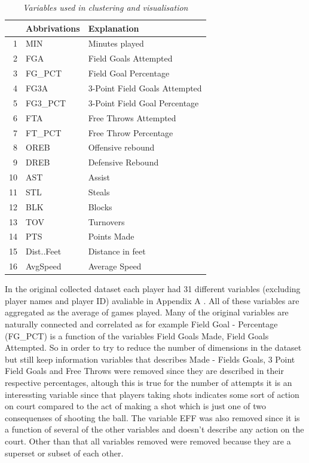 \documentclass{article}
\begin{document}
\begin{table}[ht]
\centering
\begin{tabular}{rll}
  \hline
 & \textbf{Abbrivations} & \textbf{Explanation} \\ 
  \hline
1 & MIN & Minutes played \\ 
  2 & FGA & Field Goals Attempted \\ 
  3 & FG\_PCT & Field Goal Percentage \\ 
  4 & FG3A & 3-Point Field Goals Attempted \\ 
  5 & FG3\_PCT & 3-Point Field Goal Percentage \\ 
  6 & FTA & Free Throws Attempted \\ 
  7 & FT\_PCT & Free Throw Percentage \\ 
  8 & OREB & Offensive rebound \\ 
  9 & DREB & Defensive Rebound \\ 
  10 & AST & Assist \\ 
  11 & STL & Steals \\ 
  12 & BLK & Blocks \\ 
  13 & TOV & Turnovers \\ 
  14 & PTS & Points Made \\ 
  15 & Dist..Feet & Distance in feet \\ 
  16 & AvgSpeed & Average Speed \\
   \hline
\end{tabular}
\caption{\textit{Variables used in clustering and visualisation}} 
\end{table}

In the original collected dataset each player had 31 different variables (excluding player names and player ID) avaliable in Appendix A . All of these variables are aggregated as the average of games played.   Many of the original variables are naturally connected and correlated as for example Field Goal - Percentage (FG\_PCT) is a function of the variables Field Goals Made, Field Goals Attempted. So in order to try to reduce the number of dimensions in the dataset but still keep information variables that describes Made - Fields Goals, 3 Point Field Goals and Free Throws were removed since they are described in their respective percentages, altough this is true for the number of attempts it is an interessting variable since that players taking shots indicates some sort of action on court compared to the act of making a shot which is just one of two consequenses of shooting the ball.  The variable EFF was also removed since it is a function of several of the other variables and doesn't describe any action on the court. Other than that all variables removed were removed because they are a superset or subset of each other.
\end{document}
